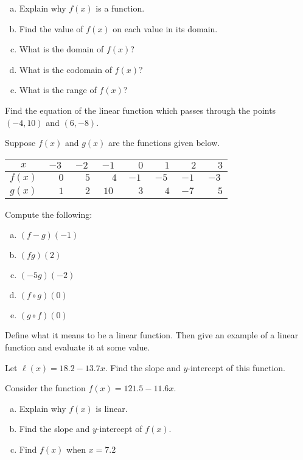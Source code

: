 \documentclass[11pt,letterpaper]{article}
\begin{document}
\begin{enumerate}[(a)]
\item Explain why $f(x)$ is a function.
\item Find the value of $f(x)$ on each value in its domain. 
\item What is the domain of $f(x)$?
\item What is the codomain of $f(x)$?
\item What is the range of $f(x)$?
\end{enumerate} \pspace	
	

\prob	 Find the equation of the linear function which passes through the points $(-4, 10)$ and $(6, -8)$. \pspace
	

\prob Suppose $f(x)$ and $g(x)$ are the functions given below. 
        \begin{table}[!ht]
        \centering
        \begin{tabular}{| c || c | c | c | c | c | c | c |} \hline
	$x$ & $-3$ & $-2$ & $-1$ & $\phantom{-}0$ & $\phantom{-}1$ & $\phantom{-}2$ & $\phantom{-}3$ \\ \hline
	$f(x)$ & $\phantom{-}0$ & $\phantom{-}5$ & $\phantom{-}4$ & $-1$ & $-5$ & $-1$ & $-3$ \\ \hline
	$g(x)$ & $\phantom{-}1$ & $\phantom{-}2$ & $10$ & $\phantom{-}3$ & $\phantom{-}4$ & $-7$ & $\phantom{-}5$  \\ \hline
        \end{tabular}
        \end{table}

Compute the following: 
        \begin{enumerate}[(a)]
	\item $(f - g)(-1)$
	\item $(fg)(2)$
	\item $(-5g)(-2)$
	\item $(f \circ g)(0)$
	\item $(g \circ f)(0)$
        \end{enumerate} \pspace 	
	

\prob Define what it means to be a linear function. Then give an example of a linear function and evaluate it at some value. \pspace 


\prob Let $\ell(x)= 18.2 - 13.7x$. Find the slope and $y$-intercept of this function. \pspace 


\prob Consider the function $f(x)= 121.5 - 11.6x$. 
	\begin{enumerate}[(a)]
	\item Explain why $f(x)$ is linear.
	\item Find the slope and $y$-intercept of $f(x)$.
	\item Find $f(x)$ when $x= 7.2$
	\end{enumerate} \pspace
\end{document}

